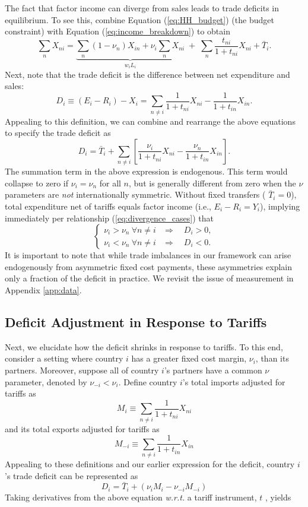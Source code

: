 \documentclass[12pt]{article}
\begin{document}
The fact that factor income can diverge from sales leads to trade deficits in equilibrium. To see this, combine Equation (\ref{eq:HH_budget}) (the budget constraint) with Equation (\ref{eq:income_breakdown}) to obtain
\[
\sum_{n}X_{ni}=\underbrace{\sum_{n}(1-\nu_{n})X_{in}+\nu_{i}\sum_{n}X_{ni}}_{w_{i}L_{i}}\;+\;\sum_{n}\frac{t_{ni}}{1+t_{ni}}X_{ni}+\bar{T}_{i}.
\]
Next, note that the trade deficit is the difference between net expenditure and sales:
\[
D_{i}\equiv (E_{i} - R_i) -X_{i}	=\sum_{n\neq i} \frac{1}{1+t_{ni}}X_{ni}- \frac{1}{1+t_{in}}X_{in}.
\]
Appealing to this definition, we can combine and rearrange the above equations to specify the trade deficit as
\[
D_{i}=\bar{T}_{i}+\sum_{n\neq i}\left[\frac{\nu_{i}}{1+t_{ni}}X_{ni}-\frac{\nu_{n}}{1+t_{in}}X_{in}\right].   
\]
The summation term in the above expression is endogenous. This term would collapse to zero if $\nu_i=\nu_n$ for all $n$, but is generally different from zero when the $\nu$ parameters are \textit{not} internationally symmetric. Without fixed transfers ( $\bar T_i=0$), total expenditure net of tariffs equals factor income (i.e., $E_i - R_i=Y_i$), implying immediately per relationship (\ref{eq:divergence_cases}) that
\begin{equation}
\begin{cases}
    \nu_i > \nu_n \ \forall n\neq i &\Longrightarrow\quad  D_i > 0, \\[4pt]
    \nu_i < \nu_n \ \forall n\neq i &\Longrightarrow\quad  D_i < 0.
\end{cases}
\label{eq:deficit_cases}
\end{equation}
It is important to note that while trade imbalances in our framework can arise endogenously from asymmetric fixed cost payments, these asymmetries explain only a fraction of the deficit in practice. We revisit the issue of measurement in Appendix \ref{app:data}.

\subsection{Deficit Adjustment in Response to Tariffs }
Next, we elucidate how the deficit shrinks in response to tariffs. To this end, consider a setting where country $i$  has a greater fixed cost margin, $\nu_i$, than its partners. Moreover, suppose all of country $i$'s partners have a common $\nu$ parameter, denoted by $\nu_{-i}<\nu_i$. Define country $i$'s total imports adjusted for tariffs as
\[
M_{i}\equiv\sum_{n\neq i}\frac{1}{1+t_{ni}}X_{ni}
\]
and its total exports adjusted for tariffs as
\[
M_{-i}\equiv\sum_{n\neq i}\frac{1}{1+t_{in}}X_{in}
\]
Appealing to these definitions and our earlier expression for the deficit, country $i$'s trade deficit can be represented as
\[
D_{i}=\bar{T}_{i}+\left(\nu_{i}M_{i}-\nu_{-i}M_{-i}\right)
\]
Taking derivatives from the above equation \textit{w.r.t.} a tariff instrument, $t$ , yields
\end{document}
